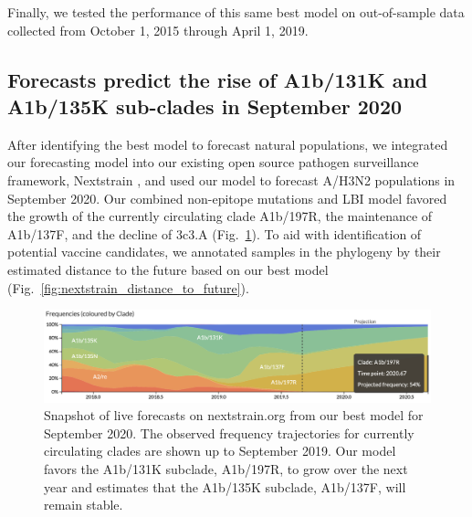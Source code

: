 Finally, we tested the performance of this same best model on out-of-sample data collected from October 1, 2015 through April 1, 2019.

\subsection*{Forecasts predict the rise of A1b/131K and A1b/135K sub-clades in September 2020}

After identifying the best model to forecast natural populations, we integrated our forecasting model into our existing open source pathogen surveillance framework, Nextstrain \cite{Hadfield2018}, and used our model to forecast A/H3N2 populations in September 2020.
Our combined non-epitope mutations and LBI model favored the growth of the currently circulating clade A1b/197R, the maintenance of A1b/137F, and the decline of 3c3.A (Fig.~\ref{fig:nextstrain_forecasts}).
To aid with identification of potential vaccine candidates, we annotated samples in the phylogeny by their estimated distance to the future based on our best model (Fig.~\ref{fig:nextstrain_distance_to_future}).

\begin{figure}[ht]
  \begin{center}
  \includegraphics[width=\textwidth]{figures/nextstrain-forecasts-for-september-2020.png}
  \caption{
    Snapshot of live forecasts on nextstrain.org from our best model for September 2020.
    The observed frequency trajectories for currently circulating clades are shown up to September 2019.
    Our model favors the A1b/131K subclade, A1b/197R, to grow over the next year and estimates that the A1b/135K subclade, A1b/137F, will remain stable.
  }
  \label{fig:nextstrain_forecasts}
  \end{center}
\end{figure}

